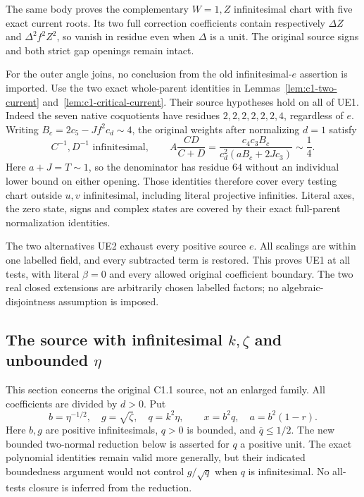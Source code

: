 The same body proves the complementary \(W=1,Z\) infinitesimal
chart with five exact current roots.  Its two full correction
coefficients contain respectively \(\Delta Z\) and
\(\Delta^2 f^2Z^2\), so vanish in residue even when \(\Delta\)
is a unit.  The original source signs and both strict gap openings
remain intact.

For the outer angle joins, no conclusion from the old infinitesimal-\(e\)
assertion is imported.  Use the two exact whole-parent identities in
Lemmas~\ref{lem:c1-two-current} and~\ref{lem:c1-critical-current}.
Their source hypotheses hold on all of UE1.  Indeed the seven native
coquotients have residues \(2,2,2,2,2,2,4\), regardless of \(e\).
Writing \(B_c=2c_5-Jf^2c_d\sim4\), the original weights after
normalizing \(d=1\) satisfy
\[
 C^{-1},D^{-1}\text{ infinitesimal},\qquad
 A\frac{CD}{C+D}
 =\frac{c_4c_3B_c}{c_d^2(aB_c+2Jc_3)}\sim\frac14.
 \tag{UE4}
\]
Here \(a+J=T\sim1\), so the denominator has residue \(64\)
without an individual lower bound on either opening.
Those identities therefore cover every testing chart outside
\(u,v\) infinitesimal, including literal projective infinities.
Literal axes, the zero state, signs and complex states are covered
by their exact full-parent normalization identities.

The two alternatives UE2 exhaust every positive source \(e\).
All scalings are within one labelled field, and every subtracted
term is restored.  This proves UE1 at all tests, with literal
\(\beta=0\) and every allowed original coefficient boundary.
The two real closed extensions are arbitrarily chosen labelled
factors; no algebraic-disjointness assumption is imposed.



\subsection{The source with infinitesimal $k,\zeta$ and unbounded $\eta$}

\label{component:p9afbe73899af}

\label{p9afbe73899af:sec:r7-c1-small}
This section concerns the original C1.1 source, not an enlarged family.
All coefficients are divided by $d>0$. Put
\[
 b=\eta^{-1/2},\quad g=\sqrt\zeta,\quad q=k^2\eta,
 \qquad x=b^2q,\quad a=b^2(1-r).
 \tag{SC1}
\]
Here $b,g$ are positive infinitesimals, $q>0$ is bounded, and
$\overline q\le1/2$. The new bounded two-normal reduction below is
asserted for $q$ a positive unit. The exact polynomial identities
remain valid more generally, but their indicated boundedness argument
would not control $g/\sqrt q$ when $q$ is infinitesimal.
No all-tests closure is inferred from the reduction.

